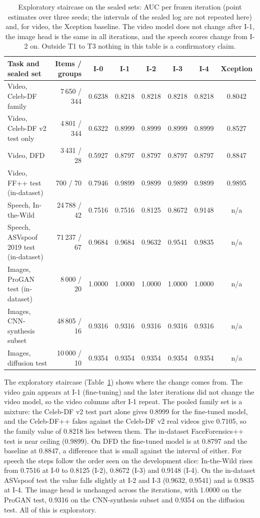 \documentclass[conference,a4paper]{IEEEtran_nodash}
\begin{document}
\begin{table}[!t]
\centering
\caption[Exploratory sealed staircase]{Exploratory staircase on the sealed sets: AUC per frozen iteration
(point estimates over three seeds; the intervals of the sealed log are not
repeated here) and, for video, the Xception baseline. The video model does not
change after I-1, the image head is the same in all iterations, and the speech
scores change from I-2 on. Outside T1 to T3 nothing in this table is a
confirmatory claim.}
\label{tab:stair}
\small
\setlength{\tabcolsep}{4pt}
\begin{tabular}{@{}l r c c c c c c@{}}
\toprule
Task and sealed set & Items / groups & I-0 & I-1 & I-2 & I-3 & I-4 & Xception \\
\midrule
Video, Celeb-DF family & 7\,650 / 344 & 0.6238 & 0.8218 & 0.8218 & 0.8218 & 0.8218 & 0.8042 \\
Video, Celeb-DF v2 test only & 4\,801 / 344 & 0.6322 & 0.8999 & 0.8999 & 0.8999 & 0.8999 & 0.8527 \\
Video, DFD & 3\,431 / 28 & 0.5927 & 0.8797 & 0.8797 & 0.8797 & 0.8797 & 0.8847 \\
Video, FF++ test (in-dataset) & 700 / 70 & 0.7946 & 0.9899 & 0.9899 & 0.9899 & 0.9899 & 0.9895 \\
\midrule
Speech, In-the-Wild & 24\,788 / 42 & 0.7516 & 0.7516 & 0.8125 & 0.8672 & 0.9148 & n/a \\
Speech, ASVspoof 2019 test (in-dataset) & 71\,237 / 67 & 0.9684 & 0.9684 & 0.9632 & 0.9541 & 0.9835 & n/a \\
\midrule
Images, ProGAN test (in-dataset) & 8\,000 / 20 & 1.0000 & 1.0000 & 1.0000 & 1.0000 & 1.0000 & n/a \\
Images, CNN-synthesis subset & 48\,805 / 16 & 0.9316 & 0.9316 & 0.9316 & 0.9316 & 0.9316 & n/a \\
Images, diffusion test & 10\,000 / 10 & 0.9354 & 0.9354 & 0.9354 & 0.9354 & 0.9354 & n/a \\
\bottomrule
\end{tabular}
\end{table}

The exploratory staircase (Table~\ref{tab:stair}) shows where the change comes
from. The video gain appears at I-1 (fine-tuning) and the later iterations did
not change the video model, so the video columns after I-1 repeat. The pooled
family set is a mixture: the Celeb-DF v2 test part alone gives 0.8999 for the
fine-tuned model, and the Celeb-DF++ fakes against the Celeb-DF v2 real videos
give 0.7105, so the family value of 0.8218 lies between them. The
in-dataset FaceForensics++ test is near ceiling (0.9899). On DFD the
fine-tuned model is at 0.8797 and the baseline at 0.8847, a difference that is
small against the interval of either. For speech the steps follow the order seen on the
development slice: In-the-Wild rises from 0.7516 at I-0 to 0.8125 (I-2), 0.8672
(I-3) and 0.9148 (I-4). On the in-dataset ASVspoof test the value falls slightly
at I-2 and I-3 (0.9632, 0.9541) and is 0.9835 at I-4. The image head is
unchanged across the iterations, with 1.0000 on the ProGAN test, 0.9316 on the
CNN-synthesis subset and 0.9354 on the diffusion test. All of this is
exploratory. %
\end{document}
